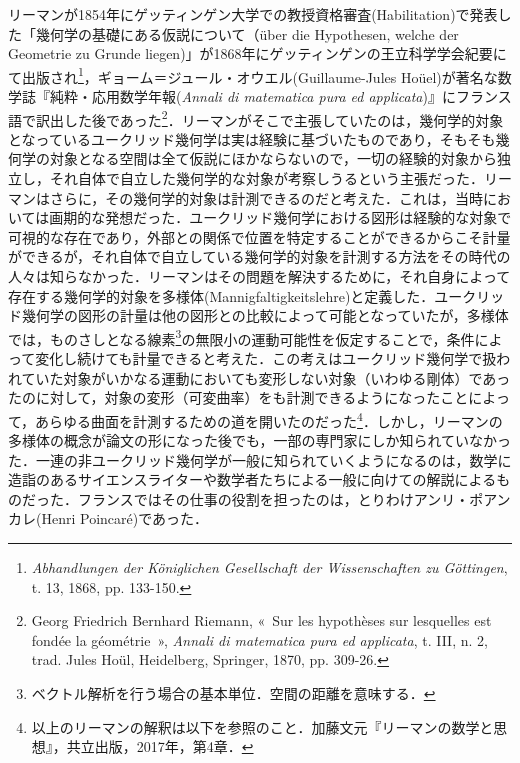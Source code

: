 リーマンが1854年にゲッティンゲン大学での教授資格審査(Habilitation)で発表した「幾何学の基礎にある仮説について（über die Hypothesen, welche der Geometrie zu Grunde liegen)」が1868年にゲッティンゲンの王立科学学会紀要にて出版され\footnote{\emph{Abhandlungen der Königlichen Gesellschaft der Wissenschaften zu Göttingen}, t. 13, 1868, pp. 133-150.}，ギョーム＝ジュール・オウエル(Guillaume-Jules Hoüel)が著名な数学誌『純粋・応用数学年報(\emph{Annali di matematica pura ed applicata})』にフランス語で訳出した後であった\footnote{Georg Friedrich Bernhard Riemann, «~Sur les hypothèses sur lesquelles est fondée la géométrie~», \emph{Annali di matematica pura ed applicata}, t. III, n. 2, trad. Jules Hoül, Heidelberg, Springer, 1870, pp. 309-26.}．リーマンがそこで主張していたのは，幾何学的対象となっているユークリッド幾何学は実は経験に基づいたものであり，そもそも幾何学の対象となる空間は全て仮説にほかならないので，一切の経験的対象から独立し，それ自体で自立した幾何学的な対象が考察しうるという主張だった．リーマンはさらに，その幾何学的対象は計測できるのだと考えた．これは，当時においては画期的な発想だった．ユークリッド幾何学における図形は経験的な対象で可視的な存在であり，外部との関係で位置を特定することができるからこそ計量ができるが，それ自体で自立している幾何学的対象を計測する方法をその時代の人々は知らなかった．リーマンはその問題を解決するために，それ自身によって存在する幾何学的対象を多様体(Mannigfaltigkeitslehre)と定義した．ユークリッド幾何学の図形の計量は他の図形との比較によって可能となっていたが，多様体では，ものさしとなる線素\footnote{ベクトル解析を行う場合の基本単位．空間の距離を意味する．}の無限小の運動可能性を仮定することで，条件によって変化し続けても計量できると考えた．この考えはユークリッド幾何学で扱われていた対象がいかなる運動においても変形しない対象（いわゆる剛体）であったのに対して，対象の変形（可変曲率）をも計測できるようになったことによって，あらゆる曲面を計測するための道を開いたのだった\footnote{以上のリーマンの解釈は以下を参照のこと．加藤文元『リーマンの数学と思想』，共立出版，2017年，第4章．}．しかし，リーマンの多様体の概念が論文の形になった後でも，一部の専門家にしか知られていなかった．一連の非ユークリッド幾何学が一般に知られていくようになるのは，数学に造詣のあるサイエンスライターや数学者たちによる一般に向けての解説によるものだった．フランスではその仕事の役割を担ったのは，とりわけアンリ・ポアンカレ(Henri Poincaré)であった．

